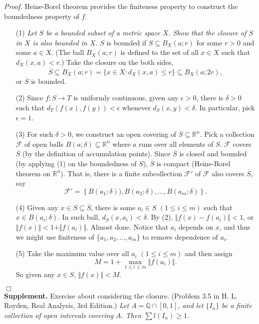 \documentclass{article}
\begin{document}
\emph{Proof.}
Heine-Borel theorem provides the finiteness property to construct
the boundedness property of $f$.
\begin{enumerate}
\item[(1)]
\emph{Let $S$ be a bounded subset of a metric space $X$.
Show that the closure of $S$ in $X$ is also bounded in $X$.}
$S$ is bounded if $S \subseteq B_X(a;r)$ for some $r > 0$ and some $a \in X$.
(The ball $B_X(a;r)$ is defined to the set of all $x \in X$ such that
$d_X(x, a) < r$.)
Take the closure on the both sides,
$$\overline{S}
\subseteq \overline{B_X(a;r)}
= \{ x \in X : d_X(x, a) \leq r \}
\subseteq B_X(a;2r),$$
or $\overline{S}$ is bounded.
\item[(2)]
Since $f: S \rightarrow T$ is uniformly continuous,
given any $\epsilon > 0$, there is $\delta > 0$ such that
$d_T(f(x), f(y)) < \epsilon$ whenever $d_S(x, y) < \delta$.
In particular, pick $\epsilon = 1$.
\item[(3)]
For such $\delta > 0$, we construct an open covering of $\overline{S} \subseteq \mathbb{R}^n$.
Pick a collection $\mathscr{F}$ of open balls
$B(a;\delta) \subseteq \mathbb{R}^n$
where $a$ runs over all elements of $S$.
$\mathscr{F}$ covers $\overline{S}$ (by the definition of accumulation points).
Since $\overline{S} $ is closed and bounded (by applying (1) on the boundedness of $S$),
$\overline{S}$ is compact
(Heine-Borel theorem on $\mathbb{R}^n$).
That is, there is a finite subcollection $\mathscr{F}'$ of $\mathscr{F}$
also covers $\overline{S}$, say
$$\mathscr{F}'
= \left\{B(a_1;\delta)), B(a_2;\delta), ..., B(a_m;\delta) \right\}.$$
\item[(4)]
Given any $x \in S \subseteq \overline{S}$,
there is some $a_i \in S$ $(1 \leq i \leq m)$ such that $x \in B(a_i;\delta)$.
In such ball, $d_S(x, a_i) < \delta$.
By (2), $\Vert f(x) - f(a_i) \Vert < 1$,
or $\Vert f(x) \Vert < 1 + \Vert f(a_i) \Vert$.
Almost done.
Notice that $a_i$ depends on $x$,
and thus we might use finiteness of $\{ a_1, a_2, ..., a_m \}$
to remove dependence of $a_i$.
\item[(5)]
Take the maximum value over all $a_i$ $(1 \leq i \leq m)$ and then assign
$$M = 1 + \max_{1 \leq i \leq m}{\Vert f(a_i) \Vert}.$$
So given any $x \in S$, $\Vert f(x) \Vert < M$.
\end{enumerate}
$\Box$ \\

\textbf{Supplement.}
Exercise about considering the closure.
(Problem 3.5 in H. L. Royden, Real Analysis, 3rd Edition.)
\emph{Let $A = \mathbb{Q} \cap [0,1]$,
and let $\{ I_n\}$ be a finite collection of open intervals covering $A$.
Then $\sum l(I_n) \geq 1$.} \\
\end{document}
